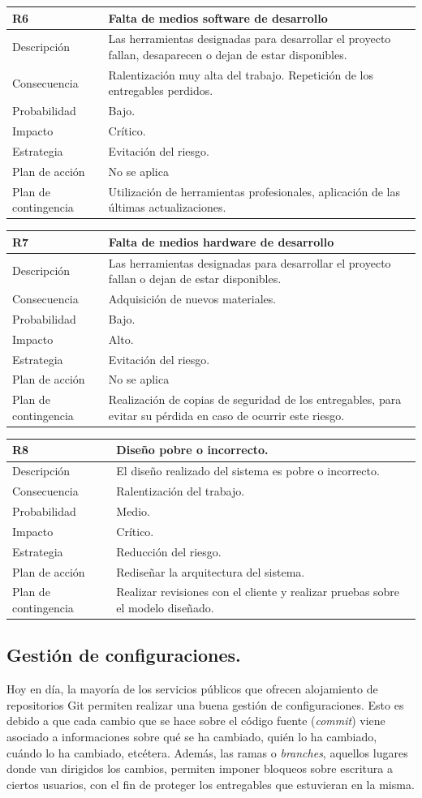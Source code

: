 \documentclass[twoside]{report}
\newcommand\addrow[2]{#1 &#2\\ }
\newcommand\addheading[2]{#1 &#2\\ \hline}
\newcommand\tabularhead{\begin{tabular}{lp{0.7\textwidth}}
\hline
}
\newenvironment{risk}{\tabularhead}
{\hline\end{tabular}}
\begin{document}
\begin{risk}
  \addheading{R6}{Falta de medios software de desarrollo}
  \addrow{Descripción}{Las herramientas designadas para desarrollar el proyecto fallan, desaparecen o dejan de estar disponibles.}
  \addrow{Consecuencia}{Ralentización muy alta del trabajo. Repetición de los entregables perdidos. }
  \addrow{Probabilidad}{Bajo.}
  \addrow{Impacto}{Crítico. }
  \addrow{Estrategia}{Evitación del riesgo.}
  \addrow{Plan de acción}{No se aplica}
  \addrow{Plan de contingencia}{Utilización de herramientas profesionales, aplicación de las últimas actualizaciones.}
\end{risk}

\begin{risk}
  \addheading{R7}{Falta de medios hardware de desarrollo}
  \addrow{Descripción}{Las herramientas designadas para desarrollar el proyecto fallan o dejan de estar disponibles.}
  \addrow{Consecuencia}{Adquisición de nuevos materiales.}
  \addrow{Probabilidad}{Bajo.}
  \addrow{Impacto}{Alto. }
  \addrow{Estrategia}{Evitación del riesgo.}
  \addrow{Plan de acción}{No se aplica}
  \addrow{Plan de contingencia}{Realización de copias de seguridad de los entregables, para evitar su pérdida en caso de ocurrir este riesgo.}
\end{risk}

\begin{risk}
  \addheading{R8}{Diseño pobre o incorrecto.} 
  \addrow{Descripción}{El diseño realizado del sistema es pobre o incorrecto.}
  \addrow{Consecuencia}{Ralentización del trabajo.}
  \addrow{Probabilidad}{Medio.}
  \addrow{Impacto}{Crítico. }
  \addrow{Estrategia}{Reducción del riesgo.}
  \addrow{Plan de acción}{Rediseñar la arquitectura del sistema.}
  \addrow{Plan de contingencia}{Realizar revisiones con el cliente y realizar pruebas sobre el modelo diseñado.}
\end{risk}

\subsection{Gestión de configuraciones.}

Hoy en día, la mayoría de los servicios públicos que ofrecen alojamiento de repositorios Git permiten realizar una buena gestión de configuraciones. Esto es debido a que cada cambio que se hace sobre el código fuente (\textit{commit}) viene asociado a informaciones sobre qué se ha cambiado, quién lo ha cambiado, cuándo lo ha cambiado, etcétera. Además, las ramas o \textit{branches}, aquellos lugares donde van dirigidos los cambios, permiten imponer bloqueos sobre escritura a ciertos usuarios, con el fin de proteger los entregables que estuvieran en la misma.
\end{document}
